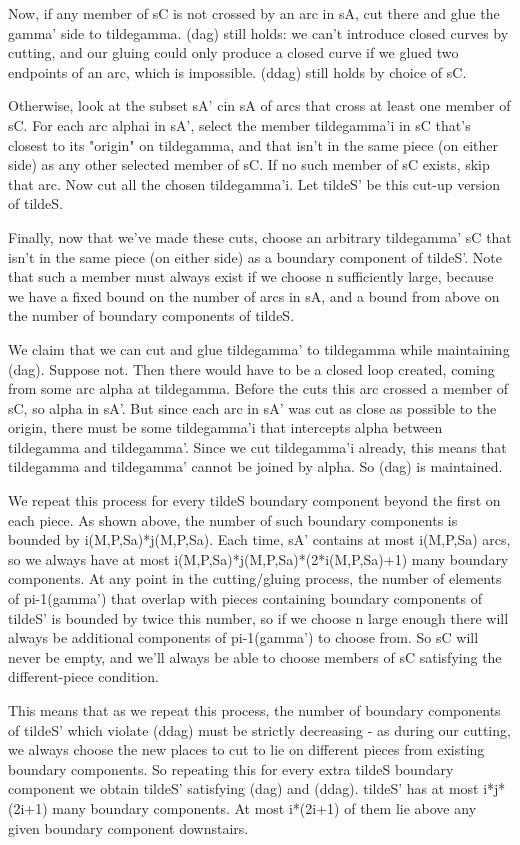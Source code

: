\documentclass[12pt]{amsart}
\theoremstyle{definition}
\theoremstyle{remark}
\begin{document}
Now, if any member of sC is not crossed by an arc in sA, cut there and glue the
gamma' side to tildegamma. (dag) still holds: we can't introduce closed curves
by cutting, and our gluing could only produce a closed curve if we glued two
endpoints of an arc, which is impossible. (ddag) still holds by choice of sC.

Otherwise, look at the subset sA' cin sA of arcs that cross at least one member
of sC. For each arc alphai in sA', select the member tildegamma'i in sC that's
closest to its "origin" on tildegamma, and that isn't in the same piece (on
either side) as any other selected member of sC. If no such member of sC
exists, skip that arc.  Now cut all the chosen tildegamma'i. Let tildeS' be
this cut-up version of tildeS.

Finally, now that we've made these cuts, choose an arbitrary tildegamma' sC
that isn't in the same piece (on either side) as a boundary component of
tildeS'.  Note that such a member must always exist if we choose n sufficiently
large, because we have a fixed bound on the number of arcs in sA, and a bound
from above on the number of boundary components of tildeS.

We claim that we can cut and glue tildegamma' to tildegamma while maintaining
(dag).  Suppose not. Then there would have to be a closed loop created, coming
from some arc alpha at tildegamma. Before the cuts this arc crossed a member of
sC, so alpha in sA'. But since each arc in sA' was cut as close as possible to
the origin, there must be some tildegamma'i that intercepts alpha between
tildegamma and tildegamma'. Since we cut tildegamma'i already, this means that
tildegamma and tildegamma' cannot be joined by alpha. So (dag) is maintained.

We repeat this process for every tildeS boundary component beyond the first on
each piece. As shown above, the number of such boundary components is bounded
by i(M,P,Sa)*j(M,P,Sa). Each time, sA' contains at most i(M,P,Sa) arcs, so we
always have at most i(M,P,Sa)*j(M,P,Sa)*(2*i(M,P,Sa)+1) many boundary
components.  At any point in the cutting/gluing process, the number of elements
of pi-1(gamma') that overlap with pieces containing boundary components of
tildeS' is bounded by twice this number, so if we choose n large enough there
will always be additional components of pi-1(gamma') to choose from. So sC will
never be empty, and we'll always be able to choose members of sC satisfying the
different-piece condition.

This means that as we repeat this process, the number of boundary components of
tildeS' which violate (ddag) must be strictly decreasing - as during our
cutting, we always choose the new places to cut to lie on different pieces from
existing boundary components. So repeating this for every extra tildeS boundary
component we obtain tildeS' satisfying (dag) and (ddag). tildeS' has at most
i*j*(2i+1) many boundary components. At most i*(2i+1) of them lie above any
given boundary component downstairs.
\end{document}

